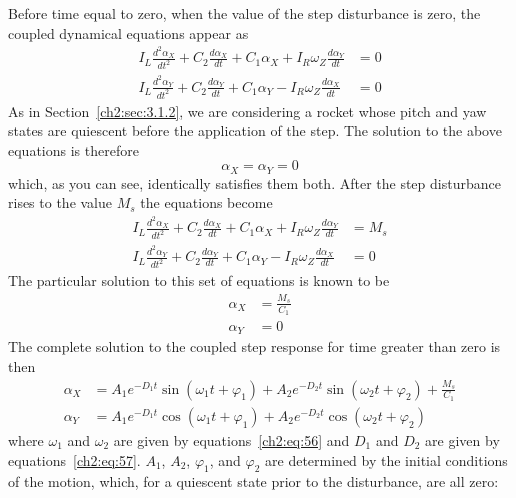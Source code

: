 Before time equal to zero, when the value of the step disturbance is zero, the
coupled dynamical equations appear as
\begin{align*}
I_L\frac{d^{2}\alpha_X}{dt^{2}} + C_2\frac{d\alpha_X}{dt} + C_1\alpha_X
  + I_R\omega_Z\frac{d\alpha_Y}{dt} &= 0\\
I_L\frac{d^{2}\alpha_Y}{dt^{2}} + C_2\frac{d\alpha_Y}{dt} + C_1\alpha_Y
  - I_R\omega_Z\frac{d\alpha_X}{dt} &= 0
\end{align*}
As in Section~\ref{ch2:sec:3.1.2}, we are considering a rocket whose pitch and
yaw states are quiescent before the application of the step. The solution to
the above equations is therefore
\begin{equation*}
\alpha_X = \alpha_Y = 0
\end{equation*}
which, as you can see, identically satisfies them both. After the step
disturbance rises to the value $M_s$ the equations become
\begin{align*}
I_L\frac{d^{2}\alpha_X}{dt^{2}} + C_2\frac{d\alpha_X}{dt} + C_1\alpha_X
  + I_R\omega_Z\frac{d\alpha_Y}{dt} &= M_s\\
I_L\frac{d^{2}\alpha_Y}{dt^{2}} + C_2\frac{d\alpha_Y}{dt} + C_1\alpha_Y
  - I_R\omega_Z\frac{d\alpha_X}{dt} &= 0
\end{align*}
The particular solution to this set of equations is known to be
\begin{equation}\label{ch2:eq:61}
\begin{aligned}
\alpha_X &= \frac{M_s}{C_1}\\
\alpha_Y &= 0
\end{aligned}
\end{equation}
The complete solution to the coupled step response for time greater than zero
is then
\begin{subequations}\label{ch2:eq:62}
\begin{align}
\alpha_X &= A_1 e^{-D_1 t}\sin(\omega_1 t + \varphi_1)
  + A_2 e^{-D_2 t}\sin(\omega_2 t + \varphi_2) + \frac{M_s}{C_1}
  \label{ch2:eq:62a}\\
\alpha_Y &= A_1 e^{-D_1 t}\cos(\omega_1 t + \varphi_1)
  + A_2 e^{-D_2 t}\cos(\omega_2 t + \varphi_2)
  \label{ch2:eq:62b}
\end{align}
\end{subequations}
where $\omega_1$ and $\omega_2$ are given by equations~\eqref{ch2:eq:56} and
$D_1$ and $D_2$ are given by equations~\eqref{ch2:eq:57}. $A_1$, $A_2$,
$\varphi_1$, and $\varphi_2$ are determined by the initial conditions of the
motion, which, for a quiescent state prior to the disturbance, are all zero:

